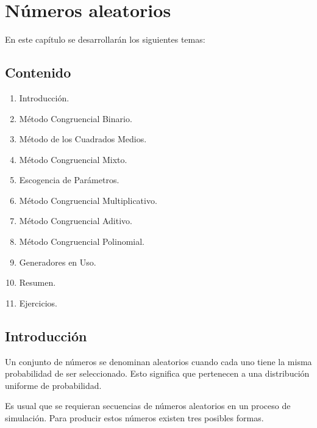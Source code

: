 \chapter{Números aleatorios}



En este capítulo se desarrollarán los siguientes temas:
\section*{Contenido}
\begin{enumerate}

\item Introducción.
\item Método Congruencial Binario.
\item Método de los Cuadrados Medios.
\item Método Congruencial Mixto.
\item Escogencia de Parámetros.
\item Método Congruencial Multiplicativo.
\item Método Congruencial Aditivo.
\item Método Congruencial Polinomial.
\item Generadores en Uso.
\item Resumen.
\item Ejercicios.

\end{enumerate}


\section{Introducción}

Un conjunto de números se denominan aleatorios cuando cada uno tiene la misma probabilidad de ser seleccionado. Esto significa que pertenecen a una distribución uniforme de probabilidad.

Es usual que se requieran secuencias de números aleatorios en un proceso de simulación. Para producir estos números existen tres posibles formas.

